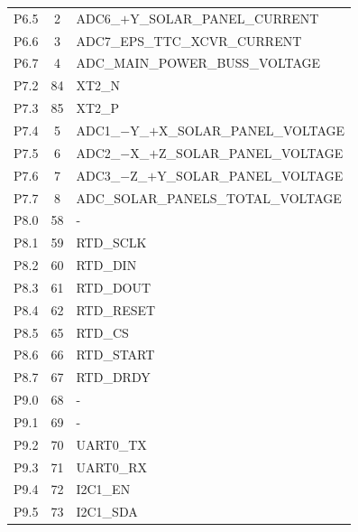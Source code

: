 \begin{longtable}{lcl}
    P6.5              & 2                   & ADC6\_$+$Y\_SOLAR\_PANEL\_CURRENT \\
    P6.6              & 3                   & ADC7\_EPS\_TTC\_XCVR\_CURRENT \\
    P6.7              & 4                   & ADC\_MAIN\_POWER\_BUSS\_VOLTAGE \\
    \midrule
    P7.2              & 84                  & XT2\_N                \\
    P7.3              & 85                  & XT2\_P                \\
    P7.4              & 5                   & ADC1\_$-$Y\_$+$X\_SOLAR\_PANEL\_VOLTAGE \\
    P7.5              & 6                   & ADC2\_$-$X\_$+$Z\_SOLAR\_PANEL\_VOLTAGE \\
    P7.6              & 7                   & ADC3\_$-$Z\_$+$Y\_SOLAR\_PANEL\_VOLTAGE \\
    P7.7              & 8                   & ADC\_SOLAR\_PANELS\_TOTAL\_VOLTAGE \\
    \midrule
    P8.0              & 58                  & -                     \\
    P8.1              & 59                  & RTD\_SCLK             \\
    P8.2              & 60                  & RTD\_DIN              \\
    P8.3              & 61                  & RTD\_DOUT             \\
    P8.4              & 62                  & RTD\_RESET            \\
    P8.5              & 65                  & RTD\_CS               \\
    P8.6              & 66                  & RTD\_START            \\
    P8.7              & 67                  & RTD\_DRDY             \\
    \midrule
    P9.0              & 68                  & -                     \\
    P9.1              & 69                  & -                     \\
    P9.2              & 70                  & UART0\_TX             \\
    P9.3              & 71                  & UART0\_RX             \\
    P9.4              & 72                  & I2C1\_EN              \\
    P9.5              & 73                  & I2C1\_SDA             \\

\end{longtable}
